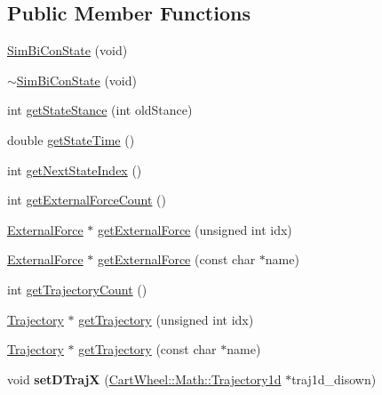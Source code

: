 \subsection*{Public Member Functions}
\begin{DoxyCompactItemize}
\item 
\hyperlink{classCartWheel_1_1Core_1_1SimBiConState_a5201e6401e9c53067b5fedaa2a457431}{SimBiConState} (void)
\item 
\hyperlink{classCartWheel_1_1Core_1_1SimBiConState_a4917b8eb30d919c48ff57526e8d9c3e1}{$\sim$SimBiConState} (void)
\item 
int \hyperlink{classCartWheel_1_1Core_1_1SimBiConState_ab81b0c4bfacfc47ea89f38b317fa87cc}{getStateStance} (int oldStance)
\item 
double \hyperlink{classCartWheel_1_1Core_1_1SimBiConState_a1af7171d7a15d9dbf166f69b927eee6d}{getStateTime} ()
\item 
int \hyperlink{classCartWheel_1_1Core_1_1SimBiConState_a662f967377a1a13c3e9dd6c0fd6384b6}{getNextStateIndex} ()
\item 
int \hyperlink{classCartWheel_1_1Core_1_1SimBiConState_a694c5a6d1749c347bec9e0b9009aa7ad}{getExternalForceCount} ()
\item 
\hyperlink{classCartWheel_1_1Core_1_1ExternalForce}{ExternalForce} $\ast$ \hyperlink{classCartWheel_1_1Core_1_1SimBiConState_a9cb8e512df76fac9c6b5b01d5db7440d}{getExternalForce} (unsigned int idx)
\item 
\hyperlink{classCartWheel_1_1Core_1_1ExternalForce}{ExternalForce} $\ast$ \hyperlink{classCartWheel_1_1Core_1_1SimBiConState_a3a05f5c94476bda0e564b9442c0fc489}{getExternalForce} (const char $\ast$name)
\item 
int \hyperlink{classCartWheel_1_1Core_1_1SimBiConState_a74bb53554ca7b7ac9a37dd1ce8d2b488}{getTrajectoryCount} ()
\item 
\hyperlink{classCartWheel_1_1Core_1_1Trajectory}{Trajectory} $\ast$ \hyperlink{classCartWheel_1_1Core_1_1SimBiConState_a769bdbaf978d76ade4eb32328f1dcaae}{getTrajectory} (unsigned int idx)
\item 
\hyperlink{classCartWheel_1_1Core_1_1Trajectory}{Trajectory} $\ast$ \hyperlink{classCartWheel_1_1Core_1_1SimBiConState_ab3928777c060a556240b59b3d78d909f}{getTrajectory} (const char $\ast$name)
\item 
\hypertarget{classCartWheel_1_1Core_1_1SimBiConState_a040a5d94309f2b9f6bf103f3e9899c90}{
void {\bfseries setDTrajX} (\hyperlink{classCartWheel_1_1Math_1_1GenericTrajectory}{CartWheel::Math::Trajectory1d} $\ast$traj1d\_\-disown)}
\label{classCartWheel_1_1Core_1_1SimBiConState_a040a5d94309f2b9f6bf103f3e9899c90}


\end{DoxyCompactItemize}
